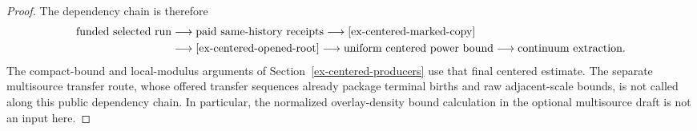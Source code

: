 \begin{proof}
The dependency chain is therefore
\[
\begin{aligned}
 \text{funded selected run}
 &\longrightarrow \text{paid same-history receipts}
 \longrightarrow \eqref{ex-centered-marked-copy}\\
 &\longrightarrow \eqref{ex-centered-opened-root}
 \longrightarrow \text{uniform centered power bound}
 \longrightarrow \text{continuum extraction}.
\end{aligned}
\]
The compact-bound and local-modulus arguments of Section~\ref{ex-centered-producers} use that final centered estimate. The separate multisource transfer route, whose offered transfer sequences already package terminal births and raw adjacent-scale bounds, is not called along this public dependency chain. In particular, the normalized overlay-density bound calculation in the optional multisource draft is not an input here.
\end{proof}
